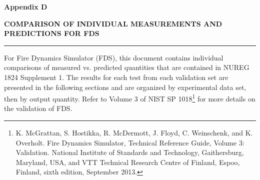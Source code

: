 \documentclass[12pt, titlepage, twoside]{article}
\begin{document}
\thispagestyle{empty}

\huge
\noindent \textbf{Appendix D}

\vspace{0.5em}
\LARGE
\noindent \textbf{COMPARISON OF INDIVIDUAL MEASUREMENTS AND PREDICTIONS FOR FDS}

\normalsize

\vspace{1.5em}
\hrule
\vspace{1.0em}

For Fire Dynamics Simulator (FDS), this document contains individual comparisons of measured vs. predicted quantities that are contained in NUREG 1824 Supplement 1. The results for each test from each validation set are presented in the following sections and are organized by experimental data set, then by output quantity. Refer to Volume 3 of NIST SP 1018\footnote{K. McGrattan, S. Hostikka, R. McDermott, J. Floyd, C. Weinschenk, and K. Overholt. Fire Dynamics Simulator, Technical Reference Guide, Volume 3: Validation. National Institute of Standards and Technology, Gaithersburg, Maryland, USA, and VTT Technical Research Centre of Finland, Espoo, Finland, sixth edition, September 2013.} for more details on the validation of FDS.

\clearpage
{}
\thispagestyle{empty}
\tableofcontents

\appendix

\setcounter{section}{3}


\end{document}
